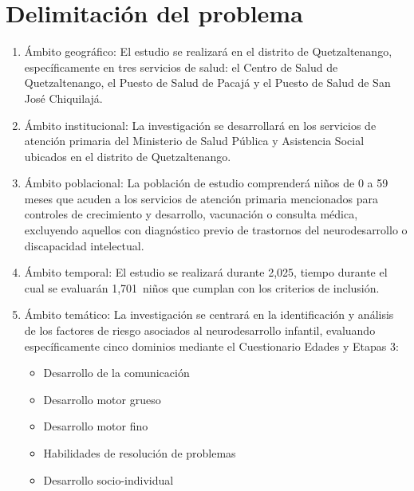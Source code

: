 \documentclass[11pt,letterpaper]{report}
\newcommand{\tiempito}{durante 2,025}
\newcommand{\muestradeseada}{1,701}
\begin{document}
\section{Delimitación del problema}
\begin{enumerate}
	\item Ámbito geográfico: El estudio se realizará en el distrito de
		Quetzaltenango, específicamente en tres servicios de salud: el Centro
		de Salud de Quetzaltenango, el Puesto de Salud de Pacajá y el Puesto de
		Salud de San José Chiquilajá.
	\item Ámbito institucional: La investigación se desarrollará en los
		servicios de atención primaria del Ministerio de Salud Pública y
		Asistencia Social ubicados en el distrito de Quetzaltenango.
	\item Ámbito poblacional: La población de estudio comprenderá niños de 0 a
		59 meses que acuden a los servicios de atención primaria mencionados
		para controles de crecimiento y desarrollo, vacunación o consulta
		médica, excluyendo aquellos con diagnóstico previo de trastornos del
		neurodesarrollo o discapacidad intelectual.
	\item Ámbito temporal: El estudio se realizará \tiempito, tiempo durante el
		cual se evaluarán \muestradeseada\ niños que cumplan con los criterios
		de inclusión.
	\item Ámbito temático: La investigación se centrará en la identificación y
		análisis de los factores de riesgo asociados al neurodesarrollo
		infantil, evaluando específicamente cinco dominios mediante el
		Cuestionario Edades y Etapas 3:
		\begin{itemize}
			\item Desarrollo de la comunicación
			\item Desarrollo motor grueso
			\item Desarrollo motor fino
			\item Habilidades de resolución de problemas
			\item Desarrollo socio-individual
		\end{itemize}
\end{enumerate}
\end{document}
